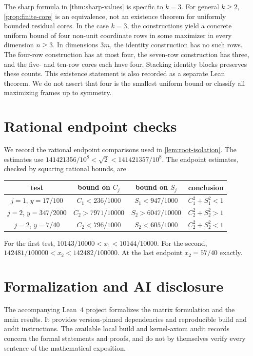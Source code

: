 \documentclass[11pt]{article}
\numberwithin{equation}{section}
\theoremstyle{definition}
\theoremstyle{definition}
\begin{document}
The sharp formula in \cref{thm:sharp-values} is specific to
$k=3$. For general $k\ge2$, \cref{prop:finite-core} is an equivalence, not
an existence theorem for uniformly bounded residual cores.
In the case $k=3$, the constructions yield a concrete uniform
bound of four non-unit coordinate rows in some maximizer in every
dimension $n\ge3$.  In dimensions $3m$, the identity construction
has no such rows.  The four-row construction has at most four, the
seven-row construction has three, and the five- and ten-row cores
each have four. Stacking identity blocks preserves these counts.
This existence statement is also recorded as a separate
Lean theorem.  We do not assert that four is the smallest uniform
bound or classify all maximizing frames up to symmetry.

\appendix
\section{Rational endpoint checks}\label{app:root-arithmetic}
We record the rational endpoint comparisons used in
\cref{lem:root-isolation}. The estimates use
$141421356/10^8<\sqrt2<141421357/10^8$.
The endpoint estimates, checked by squaring rational bounds, are
\par\smallskip
{\centering\small
\begin{tabular}{@{}c c c c@{}}
\toprule
test & bound on $C_j$ & bound on $S_j$ & conclusion\\
\midrule
$j=1$, $y=17/100$ & $C_1<236/1000$ & $S_1<947/1000$ & $C_1^2+S_1^2<1$\\
$j=2$, $y=347/2000$ & $C_2>7971/10000$ & $S_2>6047/10000$ & $C_2^2+S_2^2>1$\\
$j=2$, $y=7/40$ & $C_2<796/1000$ & $S_2<605/1000$ & $C_2^2+S_2^2<1$\\
\bottomrule
\end{tabular}\par}
\smallskip
For the first test, $10143/10000<x_1<10144/10000$.
For the second, $142481/100000<x_2<142482/100000$.
At the last endpoint $x_2=57/40$ exactly.


\clearpage
\section*{Formalization and AI disclosure}
The accompanying Lean~4 project formalizes the matrix formulation
and the main results. It provides version-pinned dependencies and
reproducible build and audit instructions. The available local build
and kernel-axiom audit records concern the formal statements and
proofs, and do not by themselves verify every sentence of the
mathematical exposition.
\end{document}
